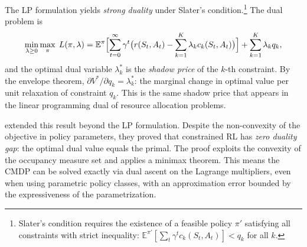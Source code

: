 The LP formulation yields \emph{strong duality} under Slater's
condition.\footnote{Slater's condition requires the existence of a feasible
policy $\pi'$ satisfying all constraints with strict inequality:
$\mathbb{E}^{\pi'}[\sum_t \gamma^t c_k(S_t,A_t)] < q_k$ for all $k$.}
The dual problem is
\begin{equation}
  \min_{\lambda \geq 0} \max_\pi \; L(\pi, \lambda)
  = \mathbb{E}^\pi\Bigl[\sum_{t=0}^\infty \gamma^t \bigl(
    r(S_t,A_t) - \sum_{k=1}^K \lambda_k c_k(S_t,A_t)
  \bigr)\Bigr] + \sum_{k=1}^K \lambda_k q_k,
  \label{eq:cmdp_lagrangian}
\end{equation}
and the optimal dual variable $\lambda_k^*$ is the \emph{shadow price} of
the $k$-th constraint. By the envelope theorem,
$\partial V^* / \partial q_k = \lambda_k^*$: the marginal change in optimal
value per unit relaxation of constraint $q_k$. This is the same shadow price
that appears in the linear programming dual of resource allocation
problems.

\citet{Paternain2019} extended this result beyond the LP formulation.
Despite the non-convexity of the objective in policy parameters, they proved
that constrained RL has \emph{zero duality gap}: the optimal dual value
equals the primal. The proof exploits the convexity of the occupancy measure
set and applies a minimax theorem. This means the CMDP can be solved
exactly via dual ascent on the Lagrange multipliers, even when using
parametric policy classes, with an approximation error bounded by the
expressiveness of the parametrization.

